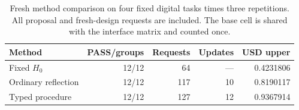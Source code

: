 \begin{table}[htbp]
\centering\small
\begin{tabular}{@{}lrrrr@{}}
\toprule
Method & PASS/groups & Requests & Updates & USD upper \\
\midrule
Fixed $H_0$ & 12/12 & 64 & --- & 0.4231806 \\
Ordinary reflection & 12/12 & 117 & 10 & 0.8190117 \\
Typed procedure & 12/12 & 127 & 12 & 0.9367914 \\
\bottomrule
\end{tabular}
\caption{Fresh method comparison on four fixed digital tasks times three repetitions. All proposal and fresh-design requests are included. The base cell is shared with the interface matrix and counted once.}\label{tab:methods}
\end{table}
